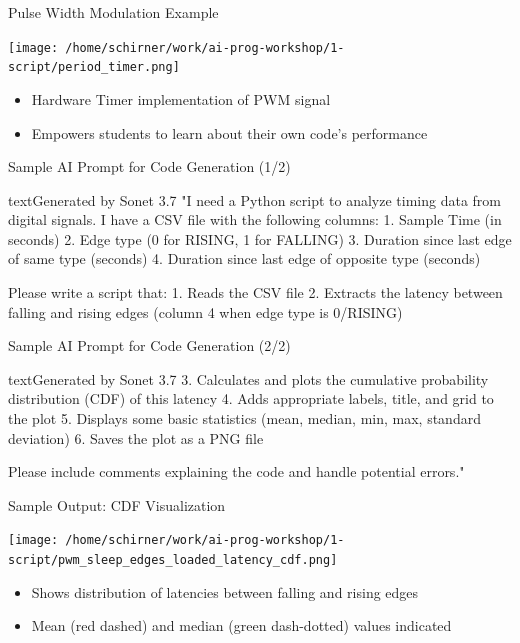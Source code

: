 \documentclass[xcolor=dvipsnames, aspectratio=169]{beamer}
\begin{document}
\begin{frame}{Pulse Width Modulation Example}
  \begin{center}
    \texttt{[image: /home/schirner/work/ai-prog-workshop/1-script/period\_timer.png]}
  \end{center}
  \begin{itemize}
    \item Hardware Timer implementation of PWM signal
    \item Empowers students to learn about their own code's performance
  \end{itemize}
\end{frame}

\begin{frame}[fragile]{Sample AI Prompt for Code Generation (1/2)}
  \begin{codeboxtc}{text}{Generated by Sonet 3.7}{}{}
"I need a Python script to analyze timing data from digital signals. I have a CSV file with the following columns:
1. Sample Time (in seconds)
2. Edge type (0 for RISING, 1 for FALLING)
3. Duration since last edge of same type (seconds)
4. Duration since last edge of opposite type (seconds)

Please write a script that:
1. Reads the CSV file
2. Extracts the latency between falling and rising edges (column 4 when edge type is 0/RISING)
  \end{codeboxtc}
\end{frame}

\begin{frame}[fragile]{Sample AI Prompt for Code Generation (2/2)}
  \begin{codeboxtc}{text}{Generated by Sonet 3.7}{}{}
3. Calculates and plots the cumulative probability distribution (CDF) of this latency
4. Adds appropriate labels, title, and grid to the plot
5. Displays some basic statistics (mean, median, min, max, standard deviation)
6. Saves the plot as a PNG file

Please include comments explaining the code and handle potential errors."
  \end{codeboxtc}
\end{frame}

\begin{frame}{Sample Output: CDF Visualization}
  \begin{center}
    \texttt{[image: /home/schirner/work/ai-prog-workshop/1-script/pwm\_sleep\_edges\_loaded\_latency\_cdf.png]}
  \end{center}
  \begin{itemize}
    \item Shows distribution of latencies between falling and rising edges
    \item Mean (red dashed) and median (green dash-dotted) values indicated
  \end{itemize}
\end{frame}
\end{document}
